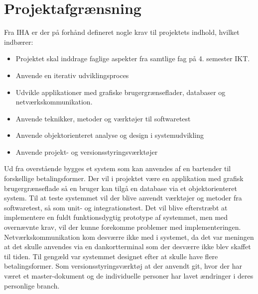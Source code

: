 \chapter{Projektafgrænsning}
Fra IHA  er der på forhånd defineret nogle krav til projektets indhold, hvilket indbærer:
\begin{itemize}
\item Projektet skal inddrage faglige aspekter fra samtlige fag på 4. semester IKT. 
\item Anvende en iterativ udviklingsproces
\item Udvikle applikationer med grafiske brugergrænseflader, databaser og
netværkskommunikation.
\item Anvende teknikker, metoder og værktøjer til softwaretest
\item Anvende objektorienteret analyse og design i systemudvikling
\item Anvende projekt- og versionsstyringsværktøjer
\newline\newline
\end{itemize}

Ud fra overstående bygges et system som kan anvendes af en bartender til forskellige betalingsformer. 
\newline\newline
Der vil i projektet være en applikation med grafisk brugergrænseflade så en bruger kan tilgå en database via et objektorienteret system. 
\newline\newline
Til at teste systemmet vil der blive anvendt værktøjer og metoder fra softwaretest, så som unit- og integrationstest. 
\newline\newline
Det vil blive efterstræbt at implementere en fuldt funktionsdygtig prototype af systemmet, men med overnævnte krav, vil der kunne forekomme problemer med implementeringen. 
\newline\newline
Netværkskommunikation kom desværre ikke med i systemet, da det var meningen at det skulle anvendes via en dankortterminal som der desværre ikke blev skaffet til tiden. Til gengæld var systemmet designet efter at skulle have flere betalingsformer.  
\newline\newline
Som versionsstyringsværktøj at der anvendt git, hvor der har været et master-dokument og de individuelle personer har lavet ændringer i deres personlige branch.  
